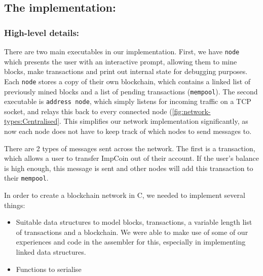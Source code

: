 \documentclass[a4paper]{article}
\begin{document}
\subsection{The implementation:}
\subsubsection{High-level details:}

There are two main executables in our implementation. First, we have \verb|node| which presents the user with an interactive prompt, allowing them to mine blocks, make transactions and print out internal state for debugging purposes. Each \verb|node| stores a copy of their own blockchain, which contains a linked list of previously mined blocks and a list of pending transactions (\verb|mempool|). The second executable is \verb|address node|, which simply listens for incoming traffic on a TCP socket, and relays this back to every connected node (\ref{fig:network-types:Centralised}. This simplifies our network implementation significantly, as now each node does not have to keep track of which nodes to send messages to.

There are 2 types of messages sent across the network. The first is a transaction, which allows a user to transfer ImpCoin out of their account. If the user's balance is high enough, this message is sent and other nodes will add this transaction to their \verb|mempool|.

In order to create a blockchain network in C, we needed to implement several things:
\begin{itemize}
    \item Suitable data structures to model blocks, transactions, a variable length list of transactions and a blockchain. We were able to make use of some of our experiences and code in the assembler for this, especially in implementing linked data structures.
    \item Functions to serialise 
\end{itemize}
\end{document}
